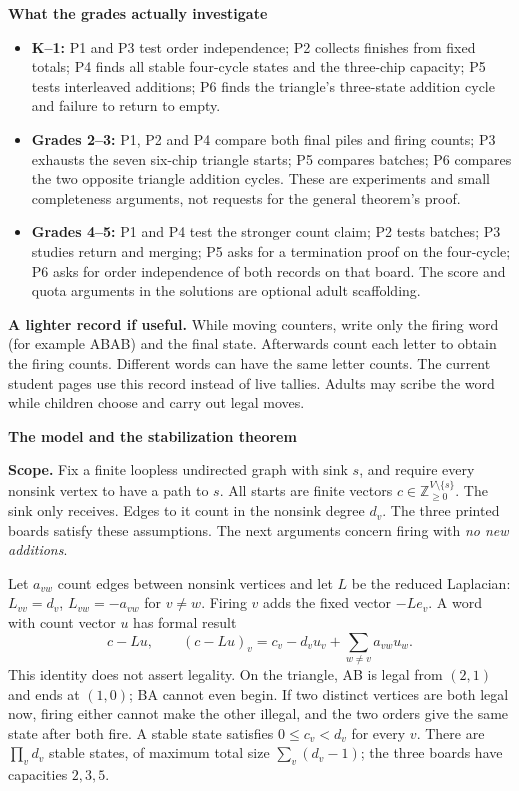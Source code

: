 \documentclass[11pt,letterpaper]{article}
\newcommand{\pagehead}[1]{{\Large\bfseries #1}\par\vspace{3pt}}
\begin{document}
\textbf{What the grades actually investigate}
\begin{itemize}
\item \textbf{K--1:} P1 and P3 test order independence; P2 collects finishes from fixed totals; P4 finds all stable four-cycle states and the three-chip capacity; P5 tests interleaved additions; P6 finds the triangle's three-state addition cycle and failure to return to empty.
\item \textbf{Grades 2--3:} P1, P2 and P4 compare both final piles and firing counts; P3 exhausts the seven six-chip triangle starts; P5 compares batches; P6 compares the two opposite triangle addition cycles. These are experiments and small completeness arguments, not requests for the general theorem's proof.
\item \textbf{Grades 4--5:} P1 and P4 test the stronger count claim; P2 tests batches; P3 studies return and merging; P5 asks for a termination proof on the four-cycle; P6 asks for order independence of both records on that board. The score and quota arguments in the solutions are optional adult scaffolding.
\end{itemize}

\textbf{A lighter record if useful.} While moving counters, write only the firing word (for example ABAB) and the final state. Afterwards count each letter to obtain the firing counts. Different words can have the same letter counts. The current student pages use this record instead of live tallies. Adults may scribe the word while children choose and carry out legal moves.

\newpage
\pagehead{The model and the stabilization theorem}\label{theorem}
\textbf{Scope.} Fix a finite loopless undirected graph with sink $s$, and require every nonsink vertex to have a path to $s$. All starts are finite vectors $c\in\mathbb Z_{\ge0}^{V\setminus\{s\}}$. The sink only receives. Edges to it count in the nonsink degree $d_v$. The three printed boards satisfy these assumptions. The next arguments concern firing with \emph{no new additions}.

Let $a_{vw}$ count edges between nonsink vertices and let $L$ be the reduced Laplacian: $L_{vv}=d_v$, $L_{vw}=-a_{vw}$ for $v\ne w$. Firing $v$ adds the fixed vector $-Le_v$. A word with count vector $u$ has formal result
\[
c-Lu,\qquad (c-Lu)_v=c_v-d_vu_v+\sum_{w\ne v}a_{vw}u_w.
\]
This identity does not assert legality. On the triangle, AB is legal from $(2,1)$ and ends at $(1,0)$; BA cannot even begin. If two distinct vertices are both legal now, firing either cannot make the other illegal, and the two orders give the same state after both fire. A stable state satisfies $0\le c_v<d_v$ for every $v$. There are $\prod_vd_v$ stable states, of maximum total size $\sum_v(d_v-1)$; the three boards have capacities $2,3,5$.
\end{document}
